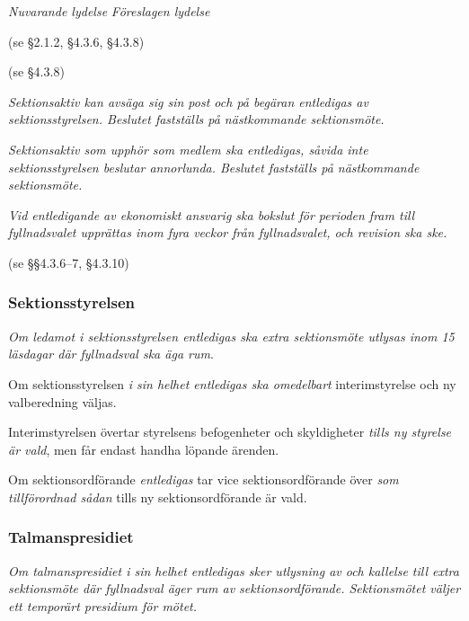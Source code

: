 \documentclass{article}
\newenvironment{lydelse}
    {\begin{paracol}{2}%
        \emph{Nuvarande lydelse}%
        \switchcolumn%
        \emph{Föreslagen lydelse}%
    \end{paracol}%
    \begin{enumerate}[label=\thesubsection.\arabic*]%
    \begin{paracol}{2}%
    }{\end{paracol}\end{enumerate}}
\begin{document}
\begin{lydelse}
  \item[] (se \S 2.1.2, \S 4.3.6, \S 4.3.8)
  \item[] (se \S 4.3.8)
  
\switchcolumn
  \setcounter{enumi}{0}
  \item \emph{Sektionsaktiv kan avsäga sig sin post och på begäran entledigas av sektionsstyrelsen.
      Beslutet fastställs på nästkommande sektionsmöte.}

  \item \emph{Sektionsaktiv som upphör som medlem ska entledigas, såvida inte sektionsstyrelsen beslutar annorlunda.
      Beslutet fastställs på nästkommande sektionsmöte.}
  \label{4.x:kvarstå}

  \item \emph{Vid entledigande av ekonomiskt ansvarig ska bokslut för perioden fram till fyllnadsvalet upprättas inom fyra veckor från fyllnadsvalet, och revision ska ske.}
    \label{4.2:enteko}

    \switchcolumn*
    \item[] (se \S\S 4.3.6--7, \S 4.3.10)
    \switchcolumn
    \subsubsection*{Sektionsstyrelsen}
    \item \emph{Om ledamot i sektionsstyrelsen entledigas ska extra sektionsmöte utlysas inom 15 läsdagar där fyllnadsval ska äga rum}.

    \item Om sektionsstyrelsen \emph{i sin helhet entledigas ska omedelbart} interimstyrelse och ny valberedning väljas.

    \item Interimstyrelsen övertar styrelsens befogenheter och skyldigheter \emph{tills ny styrelse är vald}, men får endast handha löpande ärenden.

    \item Om sektionsordförande \emph{entledigas} tar vice sektionsordförande över \emph{som tillförordnad sådan} tills ny sektionsordförande är vald.

    \subsubsection*{Talmanspresidiet}
    \item \emph{Om talmanspresidiet i sin helhet entledigas sker utlysning av och kallelse till extra sektionsmöte där fyllnadsval äger rum av sektionsordförande.
    Sektionsmötet väljer ett temporärt presidium för mötet.}


\end{lydelse}
\end{document}
